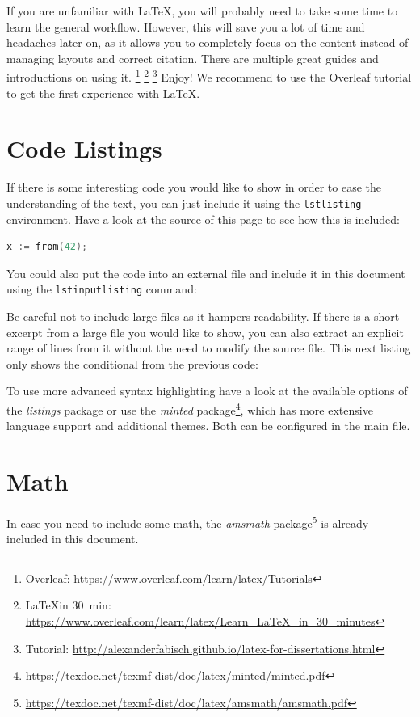If you are unfamiliar with {\LaTeX}, you will probably need to take some time to learn the general workflow. However, this will save you a lot of time and headaches later on,
as it allows you to completely focus on the content instead of managing layouts and correct citation. There are multiple great guides and introductions on using it.
\footnote{Overleaf: \url{https://www.overleaf.com/learn/latex/Tutorials}}
\footnote{\LaTeX in 30~min: \url{https://www.overleaf.com/learn/latex/Learn_LaTeX_in_30_minutes}}
\footnote{Tutorial: \url{http://alexanderfabisch.github.io/latex-for-dissertations.html}} 
Enjoy! We recommend to use the Overleaf tutorial to get the first experience with \LaTeX.
\section{Code Listings}
If there is some interesting code you would like to show
in order to ease the understanding of the text,
you can just include it using the \verb+lstlisting+ environment.
Have a look at the source of this page to see how this is included:

\begin{lstlisting}[language=Go]
x := from(42);
\end{lstlisting}

You could also put the code into an external file
and include it in this document using the \verb+lstinputlisting+ command:



Be careful not to include large files as it hampers readability.
If there is a short excerpt from a large file you would like to show,
you can also extract an explicit range of lines from it without the need to modify the source file.
This next listing only shows the conditional from the previous code:



To use more advanced syntax highlighting
have a look at the available options of the \emph{listings} package
or use the \emph{minted} package\footnote{\url{https://texdoc.net/texmf-dist/doc/latex/minted/minted.pdf}},
which has more extensive language support and additional themes.
Both can be configured in the main file.
\newpage
\section{Math}
In case you need to include some math,
the \emph{amsmath} package\footnote{\url{https://texdoc.net/texmf-dist/doc/latex/amsmath/amsmath.pdf}} is already included in this document.

